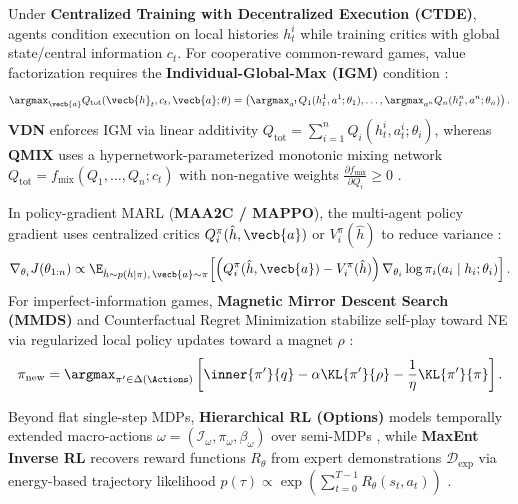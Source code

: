 \documentclass[../../../../master.tex]{subfiles}
\begin{document}
\begin{coremath}
Under \textbf{Centralized Training with Decentralized Execution (CTDE)}, agents condition execution on local histories $h_t^i$ while training critics with global state/central information $c_t$. For cooperative common-reward games, value factorization requires the \textbf{Individual-Global-Max (IGM)} condition :
\begin{equation}
\label{eq:mbrl:igm}
\argmax_{\vecb{a}} Q_{\text{tot}}(\vecb{h}_t, c_t, \vecb{a}; \theta) = \left(\argmax_{a^1} Q_1(h_t^1, a^1; \theta_1), \dots, \argmax_{a^n} Q_n(h_t^n, a^n; \theta_n)\right).
\end{equation}
\textbf{VDN} enforces IGM via linear additivity $Q_{\text{tot}} = \sum_{i=1}^n Q_i(h_t^i, a_t^i; \theta_i)$, whereas \textbf{QMIX} uses a hypernetwork-parameterized monotonic mixing network $Q_{\text{tot}} = f_{\text{mix}}(Q_1, \dots, Q_n; c_t)$ with non-negative weights $\frac{\partial f_{\text{mix}}}{\partial Q_i} \ge 0$ .

In policy-gradient MARL (\textbf{MAA2C / MAPPO}), the multi-agent policy gradient uses centralized critics $Q_i^\pi(\hat{h}, \vecb{a})$ or $V_i^\pi(\hat{h})$ to reduce variance :
\begin{equation}
\label{eq:mbrl:mappo}
\nabla_{\theta_i} J(\theta_{1:n}) \propto \E_{\hat{h} \sim p(\hat{h} \mid \pi),\, \vecb{a} \sim \pi}\!\left[\left(Q_i^\pi(\hat{h}, \vecb{a}) - V_i^\pi(\hat{h})\right) \nabla_{\theta_i} \log \pi_i(a_i \mid h_i; \theta_i)\right].
\end{equation}
For imperfect-information games, \textbf{Magnetic Mirror Descent Search (MMDS)} and Counterfactual Regret Minimization stabilize self-play toward NE via regularized local policy updates toward a magnet $\rho$ :
\begin{equation}
\label{eq:mbrl:mmds}
\pi_{\text{new}} = \argmax_{\pi' \in \Delta(\Actions)} \left[ \inner{\pi'}{q} - \alpha \KL{\pi'}{\rho} - \frac{1}{\eta}\KL{\pi'}{\pi} \right].
\end{equation}
\end{coremath}

Beyond flat single-step MDPs, \textbf{Hierarchical RL (Options)} models temporally extended macro-actions $\omega = (\mathcal{I}_\omega, \pi_\omega, \beta_\omega)$ over semi-MDPs , while \textbf{MaxEnt Inverse RL} recovers reward functions $R_\theta$ from expert demonstrations $\mathcal{D}_{\text{exp}}$ via energy-based trajectory likelihood $p(\tau) \propto \exp(\sum_{t=0}^{T-1} R_\theta(s_t, a_t))$ \newline {}.
\end{document}
